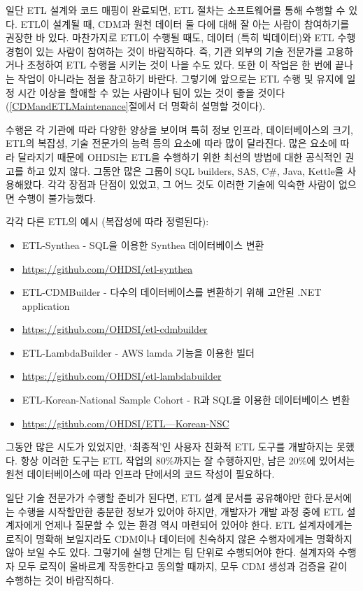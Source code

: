 \documentclass[10.5pt]{book}
\providecommand{\tightlist}{%
  \setlength{\itemsep}{0pt}\setlength{\parskip}{0pt}}
\theoremstyle{definition}
\theoremstyle{definition}
\theoremstyle{definition}
\theoremstyle{remark}
\begin{document}
일단 ETL 설계와 코드 매핑이 완료되면, ETL 절차는 소프트웨어를 통해
수행할 수 있다. ETL이 설계될 때, CDM과 원천 데이터 둘 다에 대해 잘 아는
사람이 참여하기를 권장한 바 있다. 마찬가지로 ETL이 수행될 때도, 데이터
(특히 빅데이터)와 ETL 수행 경험이 있는 사람이 참여하는 것이 바람직하다.
즉, 기관 외부의 기술 전문가를 고용하거나 초청하여 ETL 수행을 시키는 것이
나을 수도 있다. 또한 이 작업은 한 번에 끝나는 작업이 아니라는 점을
참고하기 바란다. 그렇기에 앞으로는 ETL 수행 및 유지에 일정 시간 이상을
할애할 수 있는 사람이나 팀이 있는 것이 좋을 것이다
(\ref{CDMandETLMaintenance}절에서 더 명확히 설명할 것이다).

수행은 각 기관에 따라 다양한 양상을 보이며 특히 정보 인프라,
데이터베이스의 크기, ETL의 복잡성, 기술 전문가의 능력 등의 요소에 따라
많이 달라진다. 많은 요소에 따라 달라지기 때문에 OHDSI는 ETL을 수행하기
위한 최선의 방법에 대한 공식적인 권고를 하고 있지 않다. 그동안 많은
그룹이 SQL builders, SAS, C\#, Java, Kettle을 사용해왔다. 각각 장점과
단점이 있었고, 그 어느 것도 이러한 기술에 익숙한 사람이 없으면 수행이
불가능했다.

각각 다른 ETL의 예시 (복잡성에 따라 정렬된다):

\begin{itemize}
\tightlist
\item
  ETL-Synthea - SQL을 이용한 Synthea 데이터베이스 변환
\item
  \url{https://github.com/OHDSI/etl-synthea}
\item
  ETL-CDMBuilder - 다수의 데이터베이스를 변환하기 위해 고안된 .NET
  application
\item
  \url{https://github.com/OHDSI/etl-cdmbuilder}
\item
  ETL-LambdaBuilder - AWS lamda 기능을 이용한 빌더
\item
  \url{https://github.com/OHDSI/etl-lambdabuilder}
\item
  ETL-Korean-National Sample Cohort - R과 SQL을 이용한 데이터베이스 변환
\item
  \href{https://github.com/OHDSI/ETL---Korean-NSC}{https://github.com/OHDSI/ETL---Korean-NSC}
\end{itemize}

그동안 많은 시도가 있었지만, `최종적'인 사용자 친화적 ETL 도구를
개발하지는 못했다. 항상 이러한 도구는 ETL 작업의 80\%까지는 잘
수행하지만, 남은 20\%에 있어서는 원천 데이터베이스에 따라 인프라
단에서의 코드 작성이 필요하다.

일단 기술 전문가가 수행할 준비가 된다면, ETL 설계 문서를 공유해야만
한다.문서에는 수행을 시작할만한 충분한 정보가 있어야 하지만, 개발자가
개발 과정 중에 ETL 설계자에게 언제나 질문할 수 있는 환경 역시 마련되어
있어야 한다. ETL 설계자에게는 로직이 명확해 보일지라도 CDM이나 데이터에
친숙하지 않은 수행자에게는 명확하지 않아 보일 수도 있다. 그렇기에 실행
단계는 팀 단위로 수행되어야 한다. 설계자와 수행자 모두 로직이 올바르게
작동한다고 동의할 때까지, 모두 CDM 생성과 검증을 같이 수행하는 것이
바람직하다.
\end{document}
